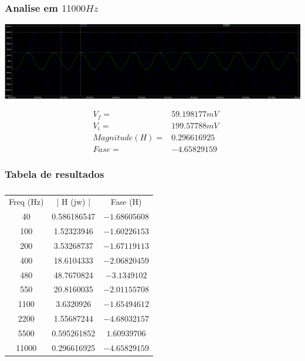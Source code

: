 \documentclass[12pt,twoside, a4paper, twocolumn]{article}
\begin{document}
\subsubsection{Analise em $11000Hz$}


\begin{adjustbox}{scale=0.09}
    \includegraphics{ltfreq11000.png}
\end{adjustbox}


\begin{equation*}
    \begin{aligned}
         & V_f =          & 59.198177mV \\
         & V_i =          & 199.57788mV \\
         & Magnitude(H) = & 0.296616925 \\
         & Fase =         & -4.65829159
    \end{aligned}
\end{equation*}


\subsubsection{Tabela de resultados}






\subparagraph*{}


\begin{center}
    \begin{tabular}{ |c|c|c| }
        \hline
        Freq (Hz) & | H (jw) |  & Fase (H)      \\
        40        & 0.586186547 & $-1.68605608$ \\
        100       & 1.52323946  & $-1.60226153$ \\
        200       & 3.53268737  & $-1.67119113$ \\
        400       & 18.6104333  & $-2.06820459$ \\
        480       & 48.7670824  & $-3.1349102$  \\
        550       & 20.8160035  & $-2.01155708$ \\
        1100      & 3.6320926   & $-1.65494612$ \\
        2200      & 1.55687244  & $-4.68032157$ \\
        5500      & 0.595261852 & $1.60939706$  \\
        11000     & 0.296616925 & $-4.65829159$ \\
        \hline
    \end{tabular}
\end{center}
\newpage
\end{document}
